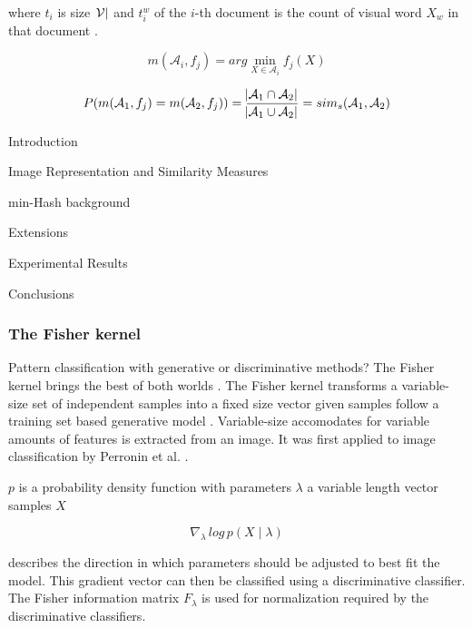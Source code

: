 \documentclass[english,12pt,a4paper,pdftex,elec,utf8]{aaltothesis}
\begin{document}
where $t_i$ is size $\abs{\mathcal{V}}$ and $t_i^w$ of the $i$-th document is the count of visual word $X_w$ in that document \cite{Chum2008}.

\begin{equation}\label{minhash}
m(\mathcal{A}_i,f_j)= arg \min_{X \in \mathcal{A}_i}f_j(X)
\end{equation}

\begin{equation}\label{minhashsim}
P(m(\mathcal{A}_1,f_j) = m(\mathcal{A}_2,f_j)) = \frac{\abs{\mathcal{A}_1 \cap \mathcal{A}_2}}{\abs{\mathcal{A}_1 \cup \mathcal{A}_2}} = sim_s(\mathcal{A}_1, \mathcal{A}_2)
\end{equation}


Introduction

Image Representation and Similarity Measures


min-Hash background

Extensions

Experimental Results

Conclusions

\cite{Chum2008} \cite{Broder1997}


\subsubsection{The Fisher kernel}
Pattern classification with generative or discriminative methods? The Fisher kernel brings the best of both worlds \cite{Jaakkola1999}. The Fisher kernel transforms a variable-size set of independent samples into a fixed size vector given samples follow a training set based generative model \cite{Jaakkola1999}. Variable-size accomodates for variable amounts of features is extracted from an image. It was first applied to image classification by Perronin et al. \cite{Perronnin2007}.

$p$ is a probability density function with parameters $\lambda$ a variable length vector samples $X$

\begin{equation}\label{fisherone}
\nabla_{\lambda}\,log\,p(X\mid\lambda)
\end{equation}

describes the direction in which parameters should be adjusted to best fit the model. This gradient vector can then be classified using a discriminative classifier. The Fisher information matrix $F_{\lambda}$ is used for normalization required by the discriminative classifiers. \cite{Perronnin2007}
\end{document}
